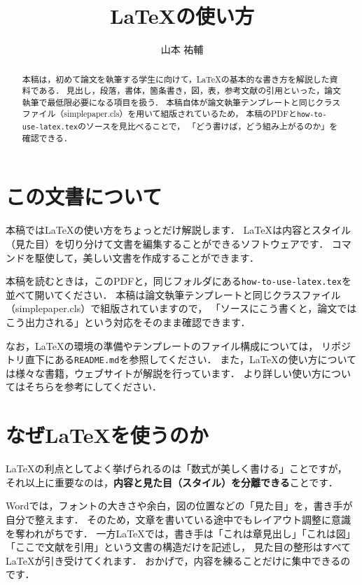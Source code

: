 \documentclass{simplepaper}
\begin{document}
\title{LaTeXの使い方}
\author{山本 祐輔}

\begin{abstract}
本稿は，初めて論文を執筆する学生に向けて，LaTeXの基本的な書き方を解説した資料である．
見出し，段落，書体，箇条書き，図，表，参考文献の引用といった，論文執筆で最低限必要になる項目を扱う．
本稿自体が論文執筆テンプレートと同じクラスファイル（simplepaper.cls）を用いて組版されているため，
本稿のPDFと\texttt{how-to-use-latex.tex}のソースを見比べることで，
「どう書けば，どう組み上がるのか」を確認できる．
\end{abstract}


\maketitle


\section{この文書について}
本稿ではLaTeXの使い方をちょっとだけ解説します．
LaTeXは内容とスタイル（見た目）を切り分けて文書を編集することができるソフトウェアです．
コマンドを駆使して，美しい文書を作成することができます．

本稿を読むときは，このPDFと，同じフォルダにある\texttt{how-to-use-latex.tex}を並べて開いてください．
本稿は論文執筆テンプレートと同じクラスファイル（simplepaper.cls）で組版されていますので，
「ソースにこう書くと，論文ではこう出力される」という対応をそのまま確認できます．

なお，LaTeXの環境の準備やテンプレートのファイル構成については，
リポジトリ直下にある\texttt{README.md}を参照してください．
また，LaTeXの使い方については様々な書籍，ウェブサイトが解説を行っています．
より詳しい使い方についてはそちらを参考にしてください．

\section{なぜLaTeXを使うのか}
LaTeXの利点としてよく挙げられるのは「数式が美しく書ける」ことですが，
それ以上に重要なのは，\textbf{内容と見た目（スタイル）を分離できる}ことです．

Wordでは，フォントの大きさや余白，図の位置などの「見た目」を，書き手が自分で整えます．
そのため，文章を書いている途中でもレイアウト調整に意識を奪われがちです．
一方LaTeXでは，書き手は「これは章見出し」「これは図」「ここで文献を引用」という文書の構造だけを記述し，
見た目の整形はすべてLaTeXが引き受けてくれます．
おかげで，内容を練ることだけに集中できるのです．
\end{document}
